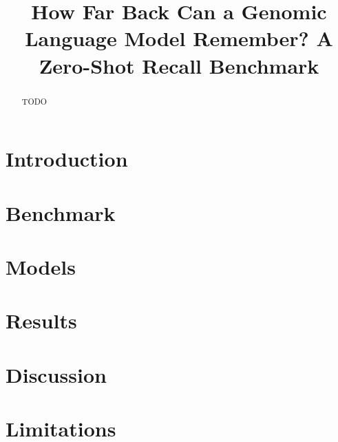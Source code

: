 \documentclass{article}
\title{How Far Back Can a Genomic Language Model Remember? A Zero-Shot Recall Benchmark}
\author{}
\begin{document}
\maketitle
\begin{abstract}
TODO
\end{abstract}
\section{Introduction}
\section{Benchmark}
\section{Models}
\section{Results}
\section{Discussion}
\section{Limitations}
\end{document}
